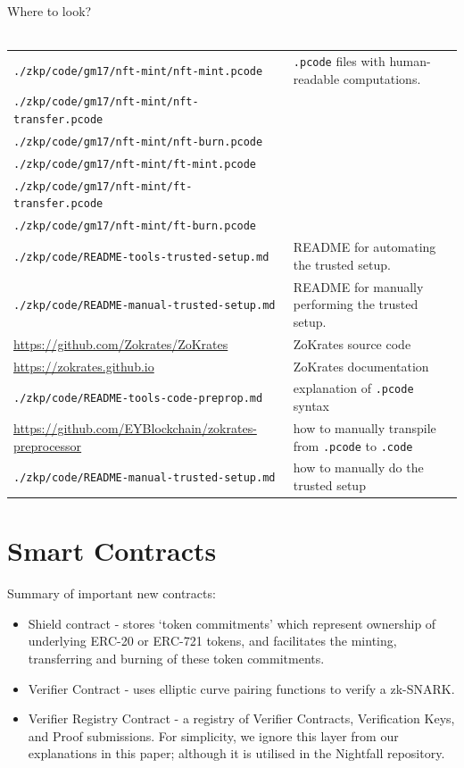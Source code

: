 \documentclass{article}
\begin{document}
\begin{center}
  \begin{mdframed}[backgroundcolor=verylightblue]
    Where to look?\\
    \\
    \begin{tabular}{lp{14cm}}
      \texttt{./zkp/code/gm17/nft-mint/nft-mint.pcode} & \texttt{.pcode} files with human-readable computations.\\
      \texttt{./zkp/code/gm17/nft-mint/nft-transfer.pcode} & \\
      \texttt{./zkp/code/gm17/nft-mint/nft-burn.pcode} & \\
      \texttt{./zkp/code/gm17/nft-mint/ft-mint.pcode} & \\
      \texttt{./zkp/code/gm17/nft-mint/ft-transfer.pcode} & \\
      \texttt{./zkp/code/gm17/nft-mint/ft-burn.pcode} & \\
      \texttt{./zkp/code/README-tools-trusted-setup.md} & README for automating the trusted setup.\\
      \texttt{./zkp/code/README-manual-trusted-setup.md} & README for manually performing the trusted setup.\\
      \url{https://github.com/Zokrates/ZoKrates} & ZoKrates source code\\
      \url{https://zokrates.github.io} & ZoKrates documentation\\
      \texttt{./zkp/code/README-tools-code-preprop.md} & explanation of \texttt{.pcode} syntax\\
      \url{https://github.com/EYBlockchain/zokrates-preprocessor} & how to manually transpile from \texttt{.pcode} to \texttt{.code}\\
      \texttt{./zkp/code/README-manual-trusted-setup.md} & how to manually do the trusted setup
    \end{tabular}
  \end{mdframed}
\end{center}

\newpage
\section{Smart Contracts}
\label{sec:smartContracts}
\secttoc

Summary of important new contracts:
\begin{itemize}
  \item Shield contract - stores `token commitments' which represent ownership of underlying ERC-20 or ERC-721 tokens, and facilitates the minting, transferring and burning of these token commitments.
  \item Verifier Contract - uses elliptic curve pairing functions to verify a zk-SNARK.
  \item Verifier Registry Contract - a registry of Verifier Contracts, Verification Keys, and Proof submissions. For simplicity, we ignore this layer from our explanations in this paper; although it is utilised in the Nightfall repository.
\end{itemize}
\end{document}
